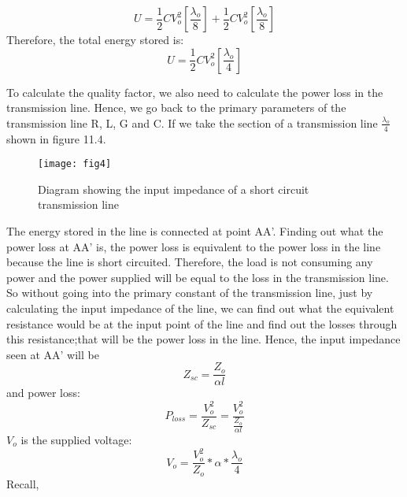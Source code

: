  
  
    \begin{equation}
  U= \frac{1}{2}CV_{o}^{2}\left[\frac{\lambda_{o}}{8}\right] +\frac{1}{2}CV_{o}^{2}\left[\frac{\lambda_{o}}{8}\right]
  \end{equation}
  Therefore, the total energy stored is:
   \begin{equation}
  U= \frac{1}{2}CV_{o}^{2}\left[\frac{\lambda_{o}}{4}\right] 
  \end{equation}

  To calculate the quality factor, we also need to calculate the power loss in the transmission line. Hence, we go back to the primary parameters of the transmission line R, L, G and C. If we take the section of a transmission line $\frac{\lambda_{o}}{4}$ shown in figure 11.4.
 \begin{figure}[h]
 	\centering
 	\texttt{[image: fig4]}
 	\caption{Diagram showing the input impedance of a short circuit transmission line}
 	
 \end{figure}
  The energy stored in the line is connected at point AA'. Finding out what the power loss at AA' is, the power loss is equivalent to the power loss in the line because the line is short circuited. Therefore, the load is not consuming any power and the power supplied will be equal to the loss in the transmission line. So without going into the primary constant of the transmission  line, just by calculating the input impedance of the line, we can find out what the equivalent resistance would be at the input point of the line and find out the losses through this resistance;that will be the power loss in the line. Hence, the input impedance seen at AA' will be
  \begin{equation}
  Z_{sc} = \frac{Z_{o}}{\alpha l}
  \end{equation}
  and power loss:
  \begin{equation}
  P_{loss} = \frac{V_{o}^{2}}{Z_{sc}} = \frac{V_{o}^{2}}{\frac{Z_{o}}{\alpha l}}
  \end{equation}
  $ V_{o} $ is the supplied voltage:
  \begin{equation}
  V_{o} = \frac{V_{o}^{2}}{Z_{o}}*\alpha *\frac{\lambda_{o}}{4}
  \end{equation}
  Recall,\\
  
